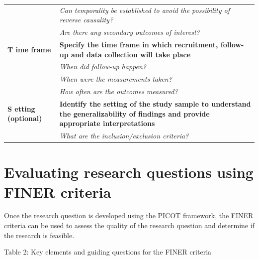 \documentclass[
]{book}
\begin{document}
\begin{longtable}[]{@{}
  >{\raggedright\arraybackslash}p{}
  >{\raggedright\arraybackslash}p{}@{}}
& \emph{Can temporality be established to avoid the possibility of reverse causality?} \\
& \emph{Are there any secondary outcomes of interest?} \\
\textbf{T ime frame} & \textbf{Specify the time frame in which recruitment, follow-up and data collection will take place} \\
& \emph{When did follow-up happen?} \\
& \emph{When were the measurements taken?} \\
& \emph{How often are the outcomes measured?} \\
\textbf{S etting (optional)} & \textbf{Identify the setting of the study sample to understand the generalizability of findings and provide appropriate interpretations} \\
& \emph{What are the inclusion/exclusion criteria?} \\
\bottomrule
\end{longtable}

\hypertarget{evaluating-research-questions-using-finer-criteria}{%
\section{Evaluating research questions using FINER criteria}\label{evaluating-research-questions-using-finer-criteria}}

Once the research question is developed using the PICOT framework, the FINER criteria can be used to assess the quality of the research question and determine if the research is feasible.

Table 2: Key elements and guiding questions for the FINER criteria
\end{document}

